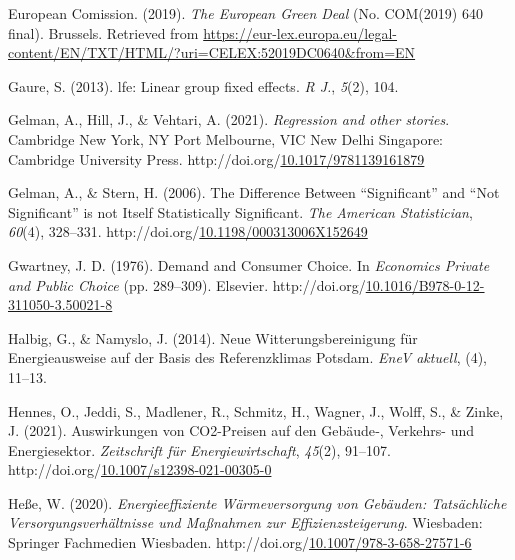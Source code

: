 \documentclass[12pt,twoside]{reedthesis}
\newlength{\cslhangindent}
\newenvironment{CSLReferences}[2] %
 {%
  \setlength{\parindent}{0pt}
  \ifodd #1 \everypar{\setlength{\hangindent}{\cslhangindent}}\ignorespaces\fi
  \ifnum #2 > 0
  \setlength{\parskip}{#2\baselineskip}
  \fi
 }%
 {}
\begin{document}
\begin{CSLReferences}{1}{0}
\leavevmode{}%
European Comission. (2019). \emph{The European Green Deal} (No. COM(2019) 640 final). Brussels. Retrieved from \url{https://eur-lex.europa.eu/legal-content/EN/TXT/HTML/?uri=CELEX:52019DC0640\&from=EN}

\leavevmode{}%
Gaure, S. (2013). lfe: Linear group fixed effects. \emph{R J.}, \emph{5}(2), 104.

\leavevmode{}%
Gelman, A., Hill, J., \& Vehtari, A. (2021). \emph{Regression and other stories}. Cambridge New York, NY Port Melbourne, VIC New Delhi Singapore: Cambridge University Press. http://doi.org/\href{https://doi.org/10.1017/9781139161879}{10.1017/9781139161879}

\leavevmode{}%
Gelman, A., \& Stern, H. (2006). The Difference Between {``Significant''} and {``Not Significant''} is not Itself Statistically Significant. \emph{The American Statistician}, \emph{60}(4), 328--331. http://doi.org/\href{https://doi.org/10.1198/000313006X152649}{10.1198/000313006X152649}

\leavevmode{}%
Gwartney, J. D. (1976). Demand and Consumer Choice. In \emph{Economics Private and Public Choice} (pp. 289--309). Elsevier. http://doi.org/\href{https://doi.org/10.1016/B978-0-12-311050-3.50021-8}{10.1016/B978-0-12-311050-3.50021-8}

\leavevmode{}%
Halbig, G., \& Namyslo, J. (2014). Neue Witterungsbereinigung für Energieausweise auf der Basis des Referenzklimas Potsdam. \emph{EneV aktuell}, (4), 11--13.

\leavevmode{}%
Hennes, O., Jeddi, S., Madlener, R., Schmitz, H., Wagner, J., Wolff, S., \& Zinke, J. (2021). Auswirkungen von CO2-Preisen auf den Gebäude‑, Verkehrs- und Energiesektor. \emph{Zeitschrift für Energiewirtschaft}, \emph{45}(2), 91--107. http://doi.org/\href{https://doi.org/10.1007/s12398-021-00305-0}{10.1007/s12398-021-00305-0}

\leavevmode{}%
Heße, W. (2020). \emph{Energieeffiziente Wärmeversorgung von Gebäuden: Tatsächliche Versorgungsverhältnisse und Maßnahmen zur Effizienzsteigerung}. Wiesbaden: Springer Fachmedien Wiesbaden. http://doi.org/\href{https://doi.org/10.1007/978-3-658-27571-6}{10.1007/978-3-658-27571-6}


\end{CSLReferences}
\end{document}
